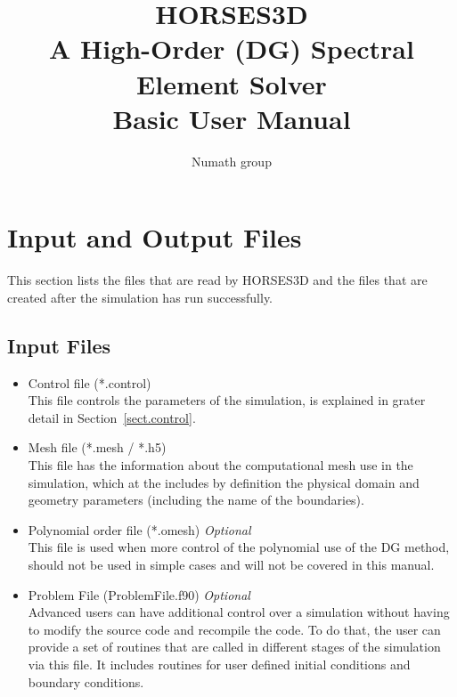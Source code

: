 \documentclass[a4paper,10pt]{report}
\title{\textbf{HORSES3D} \\ A \textbf{H}igh-\textbf{Or}der (DG) \textbf{S}pectral \textbf{E}lement \textbf{S}olver \\ \textbf{Basic User Manual}}
\author{Numath group}
\begin{document}
\maketitle

\tableofcontents


\chapter{Input and Output Files}\label{chap.IO}

This section lists the files that are read by HORSES3D and the files that are created after the simulation has run successfully.

\section{Input Files}

\begin{itemize}
\item Control file (*.control) \\
This file controls the parameters of the simulation, is explained in grater detail in Section~\ref{sect.control}.
\item Mesh file (*.mesh / *.h5) \\
This file has the information about the computational mesh use in the simulation, which at the includes by definition the physical domain and geometry parameters (including the name of the boundaries).
\item Polynomial order file (*.omesh) \emph{Optional} \\
This file is used when more control of the polynomial use of the DG method, should not be used in simple cases and will not be covered in this manual.
\item Problem File (ProblemFile.f90) \emph{Optional} \\
Advanced users can have additional control over a simulation without having to modify the source code and recompile the code. To do that, the user can provide a set of routines that are called in different stages of the simulation via this file. It includes routines for user defined initial conditions and boundary conditions.
\end{itemize}
\end{document}
